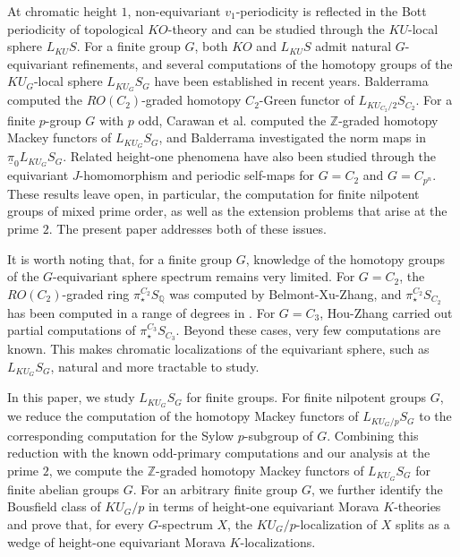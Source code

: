 \documentclass{amsart}
\theoremstyle{plain}
\theoremstyle{definition}
\theoremstyle{remark}
\begin{document}
At chromatic height $1$, non-equivariant $v_1$-periodicity is reflected in the Bott periodicity of topological $KO$-theory and can be studied through the $KU$-local sphere $L_{KU}S$. For a finite group $G$, both $KO$ and $L_{KU}S$ admit natural $G$-equivariant refinements, and several computations of the homotopy groups of the $KU_G$-local sphere $L_{KU_G}S_G$ have been established in recent years. Balderrama\cite{balderrama2021c_2} computed the $RO(C_2)$-graded homotopy $C_2$-Green functor of $L_{KU_{C_2}/2}S_{C_2}$. For a finite $p$-group $G$ with $p$ odd, Carawan et al.\cite{carawan2023homotopy} computed the $\mathbb{Z}$-graded homotopy Mackey functors of $L_{KU_G}S_G$, and Balderrama\cite{balderrama2024total} investigated the norm maps in $\underline{\pi}_0L_{KU_G}S_G$. 
Related height-one phenomena have also been studied through the equivariant $J$-homomorphism\cite{french2009equivariant,balderrama2023equivalences} and periodic self-maps for $G=C_2$\cite{quigley2021real, bhattacharya2022} and $G=C_{p^n}$\cite{balderrama2024cpn}. These results leave open, in particular, the computation for finite nilpotent groups of mixed prime order, as well as the extension problems that arise at the prime $2$. The present paper addresses both of these issues.

It is worth noting that, for a finite group $G$, knowledge of the homotopy groups of the $G$-equivariant sphere spectrum remains very limited. For $G=C_2$, the $RO(C_2)$-graded ring $\pi_{\star}^{C_2}S_{\mathbb{Q}}$ was computed by Belmont-Xu-Zhang\cite{belmont2024reduced}, and $\pi_\star^{C_2} S_{C_2}$ has been computed in a range of degrees in \cite{araki1982equivariant, iriye1982equivariant, dugger2017Z, belmont2022r, belmont2021C2, ma2022borel, guillou2024c_2}. For $G=C_3$, Hou-Zhang\cite{hou2025c_3} carried out partial computations of $\pi_\star^{C_3} S_{C_3}$. Beyond these cases, very few computations are known. This makes chromatic localizations of the equivariant sphere, such as $L_{KU_G}S_G$, natural and more tractable to study.

In this paper, we study $L_{KU_G}S_G$ for finite groups. For finite nilpotent groups $G$, we reduce the computation of the homotopy Mackey functors of $L_{KU_G/p}S_G$ to the corresponding computation for the Sylow $p$-subgroup of $G$. Combining this reduction with the known odd-primary computations and our analysis at the prime $2$, we compute the $\mathbb{Z}$-graded homotopy Mackey functors of $L_{KU_G}S_G$ for finite abelian groups $G$. For an arbitrary finite group $G$, we further identify the Bousfield class of $KU_G/p$ in terms of height-one equivariant Morava $K$-theories and prove that, for every $G$-spectrum $X$, the $KU_G/p$-localization of $X$ splits as a wedge of height-one equivariant Morava $K$-localizations.
\end{document}
